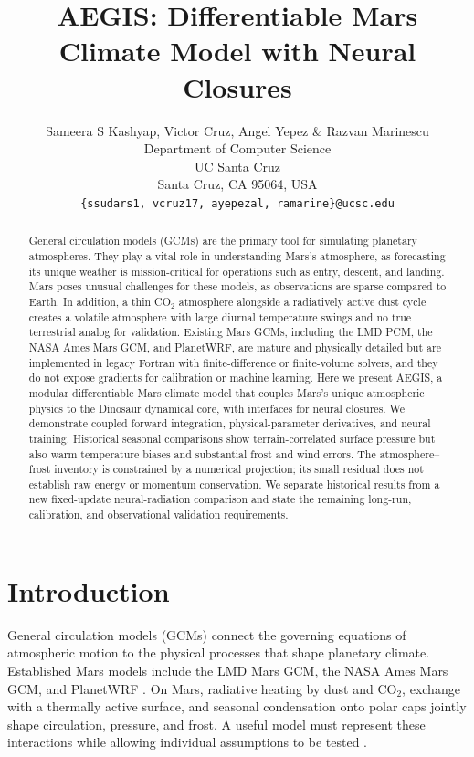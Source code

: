 \documentclass{article} %
\title{AEGIS: Differentiable Mars Climate Model with Neural Closures}
\author{Sameera S Kashyap, Victor Cruz, Angel Yepez  \& Razvan Marinescu \\
Department of Computer Science\\
UC Santa Cruz\\
Santa Cruz, CA 95064, USA \\
\texttt{\{ssudars1, vcruz17, ayepezal, ramarine\}@ucsc.edu} \\
}
\newcommand{\co}{CO$_2$}
\begin{document}
\maketitle
\begin{abstract}
General circulation models (GCMs) are the primary tool for simulating planetary atmospheres. They play a vital role in understanding Mars's atmosphere, as forecasting its unique weather is mission-critical for operations such as entry, descent, and landing. Mars poses unusual challenges for these models, as observations are sparse compared to Earth.  In addition, a thin \co{} atmosphere alongside a radiatively active dust cycle creates a volatile atmosphere with large diurnal temperature swings and no true terrestrial analog for validation. Existing Mars GCMs, including the LMD PCM, the NASA Ames Mars GCM, and PlanetWRF, are mature and physically detailed but are implemented in legacy Fortran with finite-difference or finite-volume solvers, and they do not expose gradients for calibration or machine learning. Here we present AEGIS, a modular differentiable Mars climate model that couples Mars's unique atmospheric physics to the Dinosaur dynamical core, with interfaces for neural closures. We demonstrate coupled forward integration, physical-parameter derivatives, and neural training. Historical seasonal comparisons show terrain-correlated surface pressure but also warm temperature biases and substantial frost and wind errors. The atmosphere--frost inventory is constrained by a numerical projection; its small residual does not establish raw energy or momentum conservation. We separate historical results from a new fixed-update neural-radiation comparison and state the remaining long-run, calibration, and observational validation requirements.
\end{abstract}

\section{Introduction}
General circulation models (GCMs) connect the governing equations of atmospheric motion to the physical processes that shape planetary climate. Established Mars models include the LMD Mars GCM, the NASA Ames Mars GCM, and PlanetWRF \citep{forget1999,haberle1993,richardson2007}. On Mars, radiative heating by dust and \co{}, exchange with a thermally active surface, and seasonal condensation onto polar caps jointly shape circulation, pressure, and frost. A useful model must represent these interactions while allowing individual assumptions to be tested \citep{forget2010co2cycle}.
\end{document}
